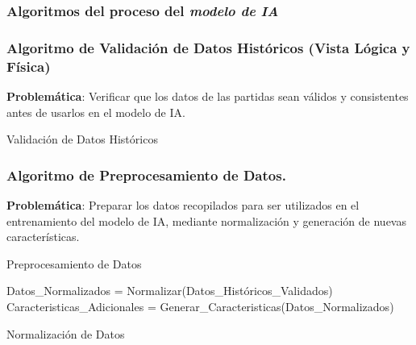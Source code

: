 \subsubsection{Algoritmos del proceso del \textit{modelo de IA}}
\subsubsection*{Algoritmo de Validación de Datos Históricos (Vista Lógica y Física)}
\textbf{Problemática}: Verificar que los datos de las partidas sean válidos y consistentes antes de usarlos en el modelo de IA.

\begin{algorithm}[H]
\caption{Validación de Datos Históricos}
\SetAlgoLined
{}
\end{algorithm}

\subsubsection*{Algoritmo de Preprocesamiento de Datos.}
\textbf{Problemática}: Preparar los datos recopilados para ser utilizados en el entrenamiento del modelo de IA, mediante normalización y generación de nuevas características.

\begin{algorithm}[H]
\caption{Preprocesamiento de Datos}
\SetAlgoLined
{}
Datos\_Normalizados = Normalizar(Datos\_Históricos\_Validados)\;
Caracteristicas\_Adicionales = Generar\_Caracteristicas(Datos\_Normalizados)\;
\end{algorithm}

\begin{algorithm}[H]
\caption{Normalización de Datos}
\SetAlgoLined
{}
\end{algorithm}

